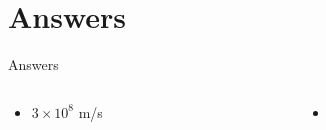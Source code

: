 \documentclass{beamer}
\begin{document}
\section{Answers}

\begin{frame}{Answers}
\tiny
\begin{columns}[T]
\begin{column}{0.5\textwidth}
\begin{itemize}
\item $3 \times 10^{8}$ m/s
\end{itemize}
\end{column}
\begin{column}{0.5\textwidth}
\begin{itemize}
\item 
\end{itemize}
\end{column}
\end{columns}
\end{frame}
\end{document}
